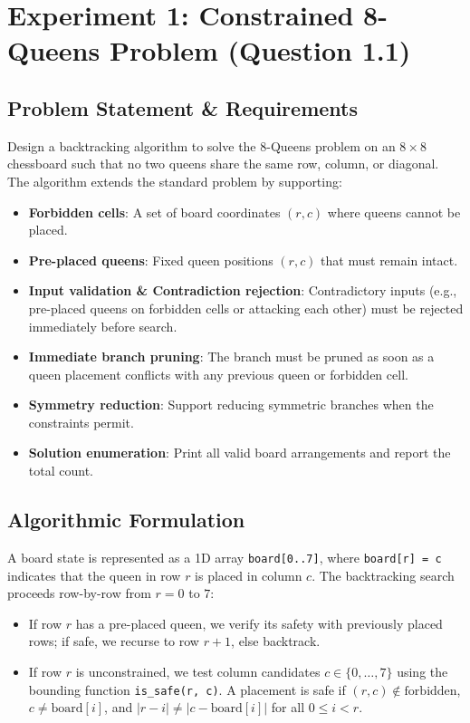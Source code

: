 \documentclass[12pt]{article}
\begin{document}
\section{Experiment 1: Constrained 8-Queens Problem (Question 1.1)}

\subsection{Problem Statement \& Requirements}
Design a backtracking algorithm to solve the 8-Queens problem on an $8 \times 8$ chessboard such that no two queens share the same row, column, or diagonal. The algorithm extends the standard problem by supporting:
\begin{itemize}
    \item \textbf{Forbidden cells}: A set of board coordinates $(r, c)$ where queens cannot be placed.
    \item \textbf{Pre-placed queens}: Fixed queen positions $(r, c)$ that must remain intact.
    \item \textbf{Input validation \& Contradiction rejection}: Contradictory inputs (e.g., pre-placed queens on forbidden cells or attacking each other) must be rejected immediately before search.
    \item \textbf{Immediate branch pruning}: The branch must be pruned as soon as a queen placement conflicts with any previous queen or forbidden cell.
    \item \textbf{Symmetry reduction}: Support reducing symmetric branches when the constraints permit.
    \item \textbf{Solution enumeration}: Print all valid board arrangements and report the total count.
\end{itemize}

\subsection{Algorithmic Formulation}
A board state is represented as a 1D array \texttt{board[0..7]}, where \texttt{board[r] = c} indicates that the queen in row $r$ is placed in column $c$. The backtracking search proceeds row-by-row from $r = 0$ to $7$:
\begin{itemize}
    \item If row $r$ has a pre-placed queen, we verify its safety with previously placed rows; if safe, we recurse to row $r+1$, else backtrack.
    \item If row $r$ is unconstrained, we test column candidates $c \in \{0, \dots, 7\}$ using the bounding function \texttt{is\_safe(r, c)}. A placement is safe if $(r, c) \notin \text{forbidden}$, $c \neq \text{board}[i]$, and $|r - i| \neq |c - \text{board}[i]|$ for all $0 \le i < r$.
\end{itemize}
\end{document}
